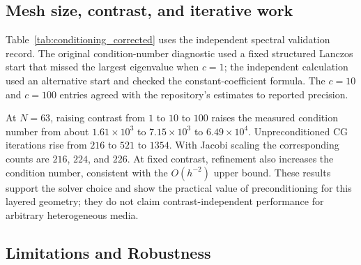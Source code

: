 \subsection{Mesh size, contrast, and iterative work}
Table~\ref{tab:conditioning_corrected} uses the independent spectral
validation record. The original condition-number diagnostic used a fixed
structured Lanczos start that missed the largest eigenvalue when $c=1$;
the independent calculation used an alternative start and checked the
constant-coefficient formula. The $c=10$ and $c=100$ entries agreed with
the repository's estimates to reported precision.

\begin{table}[H]
\centering\small

\caption{Condition number and CG iterations for harmonic FDM under mesh
refinement and contrast. Residual tolerance is $10^{-12}$; the spectral
estimates use the independently checked largest eigenvalue.}
\label{tab:conditioning_corrected}
\end{table}

At $N=63$, raising contrast from $1$ to $10$ to $100$ raises the measured
condition number from about $1.61\times10^3$ to $7.15\times10^3$ to
$6.49\times10^4$. Unpreconditioned CG iterations rise from $216$ to $521$
to $1354$. With Jacobi scaling the corresponding counts are $216$, $224$,
and $226$. At fixed contrast, refinement also increases the condition
number, consistent with the $O(h^{-2})$ upper bound. These results support
the solver choice and show the practical value of preconditioning for this
layered geometry; they do not claim contrast-independent performance for
arbitrary heterogeneous media.

\subsection{Limitations and Robustness}
\label{sec:limitations}

